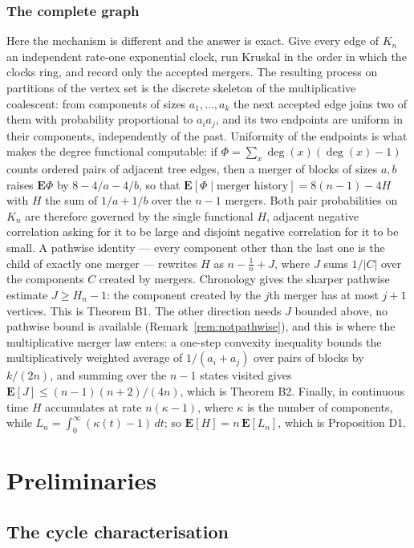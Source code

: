 \documentclass[11pt,a4paper]{amsart}
\theoremstyle{plain}
\theoremstyle{definition}
\theoremstyle{remark}
\newcommand{\E}{\mathbf{E}}
\DeclareMathOperator{\dg}{deg}
\begin{document}
\subsubsection*{The complete graph}
Here the mechanism is different and the answer is exact. Give every edge of
$K_n$ an independent rate-one exponential clock, run Kruskal in the order in
which the clocks ring, and record only the accepted mergers. The resulting
process on partitions of the vertex set is the discrete skeleton of the
multiplicative coalescent: from components of sizes $a_1,\dots,a_k$ the next
accepted edge joins two of them with probability proportional to $a_ia_j$, and
its two endpoints are uniform in their components, independently of the past.
Uniformity of the endpoints is what makes the degree functional computable: if
$\Phi=\sum_x\dg(x)(\dg(x)-1)$ counts ordered pairs of adjacent tree edges, then
a merger of blocks of sizes $a,b$ raises $\E\Phi$ by $8-4/a-4/b$, so that
$\E[\Phi\mid\text{merger history}]=8(n-1)-4H$ with $H$ the sum of $1/a+1/b$ over
the $n-1$ mergers. Both pair probabilities on $K_n$ are therefore governed by
the single functional $H$, adjacent negative correlation asking for it to be
large and disjoint negative correlation for it to be small. A pathwise identity
--- every component other than the last one is the child of exactly one merger
--- rewrites $H$ as $n-\frac1n+J$, where $J$ sums $1/|C|$ over the components $C$
created by mergers. Chronology gives the sharper pathwise estimate
$J\ge H_n-1$: the component created by the $j$th merger has at most $j+1$
vertices. This is Theorem B1. The other direction
needs $J$ bounded above, no pathwise bound is available
(Remark~\ref{rem:notpathwise}), and this is where the multiplicative merger law
enters: a one-step convexity inequality bounds the multiplicatively weighted
average of $1/(a_i+a_j)$ over pairs of blocks by $k/(2n)$, and summing over the
$n-1$ states visited gives $\E[J]\le(n-1)(n+2)/(4n)$, which is Theorem B2.
Finally, in continuous time $H$ accumulates at rate $n(\kappa-1)$, where
$\kappa$ is the number of components, while $L_n=\int_0^\infty(\kappa(t)-1)\,dt$;
so $\E[H]=n\,\E[L_n]$, which is Proposition D1.

\section{Preliminaries}
\label{sec:prelim}

\subsection{The cycle characterisation}
\end{document}
